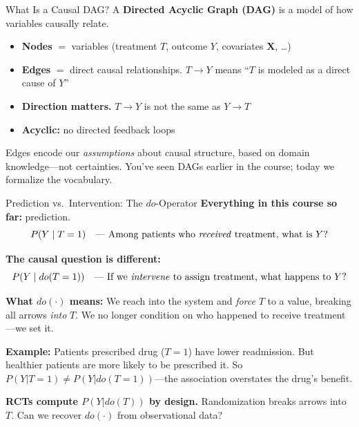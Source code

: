 \documentclass[aspectratio=169,10pt]{beamer}
\begin{document}
\begin{frame}{What Is a Causal DAG?}
A \textbf{Directed Acyclic Graph (DAG)} is a model of how variables causally relate.

\vspace{0.3em}
\begin{center}
\end{center}

\vspace{0.2em}
\begin{itemize}
    \item \textbf{Nodes} $=$ variables (treatment $T$, outcome $Y$, covariates $\mathbf{X}$, \ldots)
    \item \textbf{Edges} $=$ direct causal relationships. $T \to Y$ means ``$T$ is modeled as a direct cause of $Y$''
    \item \textbf{Direction matters.} $T \to Y$ is not the same as $Y \to T$
    \item \textbf{Acyclic:} no directed feedback loops
\end{itemize}

\vspace{0.2em}
{\small Edges encode our \emph{assumptions} about causal structure, based on domain knowledge---not certainties. You've seen DAGs earlier in the course; today we formalize the vocabulary.}
\end{frame}

\begin{frame}{Prediction vs.\ Intervention: The $do$-Operator}
\textbf{Everything in this course so far:} prediction.
$$P(Y \mid T = 1) \quad\text{--- Among patients who \emph{received} treatment, what is }Y\text{?}$$

\pause
\textbf{The causal question is different:}
$$P(Y \mid do(T = 1)) \quad\text{--- If we \emph{intervene} to assign treatment, what happens to }Y\text{?}$$

\vspace{0.3em}
\textbf{What $do(\cdot)$ means:} We reach into the system and \emph{force} $T$ to a value, breaking all arrows \emph{into} $T$. We no longer condition on who happened to receive treatment---we set it.

\vspace{0.3em}
\textbf{Example:} Patients prescribed drug ($T{=}1$) have lower readmission. But healthier patients are more likely to be prescribed it. So $P(Y|T{=}1) \neq P(Y|do(T{=}1))$---the association overstates the drug's benefit.

\vspace{0.2em}
{\small \textbf{RCTs compute $P(Y|do(T))$ by design.} Randomization breaks arrows into $T$. Can we recover $do(\cdot)$ from observational data?}
\end{frame}
\end{document}
